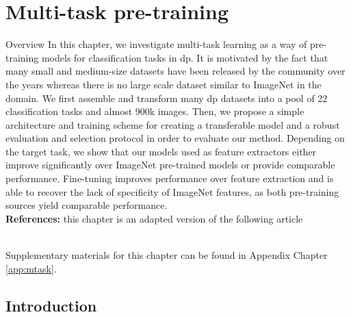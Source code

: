 \chapter{Multi-task pre-training}
\label{chap:mtask}


\begin{overview}{Overview}
In this chapter, we investigate multi-task learning as a way of pre-training models for classification tasks in \acrlong{dp}. It is motivated by the fact that many small and medium-size datasets have been released by the community over the years whereas there is no large scale dataset similar to ImageNet in the domain. We first assemble and transform many \acrlong{dp} datasets into a pool of 22 classification tasks and almost 900k images. Then, we propose a simple architecture and training scheme for creating a transferable model and a robust evaluation and selection protocol in order to evaluate our method. Depending on the target task, we show that our models used as feature extractors either improve significantly over ImageNet pre-trained models or provide comparable performance. Fine-tuning improves performance over feature extraction and is able to recover the lack of specificity of ImageNet features, as both pre-training sources yield comparable performance. \\

\textbf{References:} this chapter is an adapted version of the following article

 \\

Supplementary materials for this chapter can be found in Appendix Chapter \ref{app:mtask}.
\end{overview}



%


\section{Introduction}

